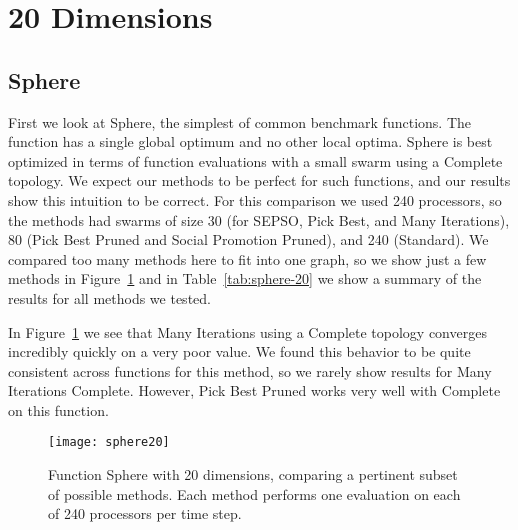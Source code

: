 \documentclass[ms,electronic,twosidetoc,letterpaper,chaptercenter,parttop,equalmargins]{byumsphd}
\newcommand{\fig}[1]{Figure~\ref{fig:#1}}
\newcommand{\tabref}[1]{Table~\ref{tab:#1}}
\begin{document}
\section{20 Dimensions}
\label{sec:20dims}

\subsection{Sphere}

First we look at Sphere, the simplest of common benchmark functions.  The
function has a single global optimum and no other local optima.  Sphere is best
optimized in terms of function evaluations with a small swarm using a Complete
topology.  We expect our methods to be perfect for such functions, and our
results show this intuition to be correct.  For this comparison we used 240
processors, so the methods had swarms of size 30 (for SEPSO, Pick Best, and
Many Iterations), 80 (Pick Best Pruned and Social Promotion Pruned), and 240
(Standard).  We compared too many methods here to fit into one graph, so we
show just a few methods in \fig{sphere-20} and in \tabref{sphere-20} we show a
summary of the results for all methods we tested.

In \fig{sphere-20} we see that Many Iterations using a Complete topology
converges incredibly quickly on a very poor value.  We found this behavior to
be quite consistent across functions for this method, so we rarely show results
for Many Iterations Complete.  However, Pick Best Pruned works very well with
Complete on this function.

\begin{figure}
  \centering
  \texttt{[image: sphere20]}
  \caption{Function Sphere with 20 dimensions, comparing a pertinent subset of
  possible methods.  Each method performs one evaluation on each of 240
  processors per time step.}
  \label{fig:sphere-20}
\end{figure}
\end{document}
